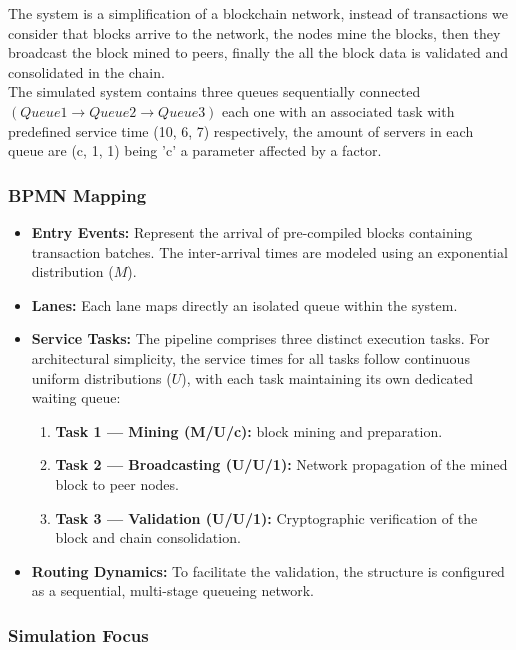 \documentclass[12pt,a4paper]{article}
\begin{document}
	The system is a simplification of a blockchain network, instead of transactions we consider that blocks arrive to the network, the nodes mine the blocks, then they broadcast the block mined to peers, finally the all the block data is validated and consolidated in the chain.\\
	
	\noindent The simulated system contains three queues sequentially connected $(Queue1 \to Queue2 \to Queue3)$ each one with an associated task with predefined service time (10, 6, 7) respectively, the amount of servers in each queue are (c, 1, 1) being 'c' a parameter affected by a factor.
	
	\subsubsection*{BPMN Mapping}
	
	\begin{itemize}
		\item \textbf{Entry Events:} Represent the arrival of pre-compiled blocks containing transaction batches. The inter-arrival times are modeled using an exponential distribution ($M$).
		\item \textbf{Lanes:} Each lane maps directly an isolated queue within the system.
		\item \textbf{Service Tasks:} The pipeline comprises three distinct execution tasks. For architectural simplicity, the service times for all tasks follow continuous uniform distributions ($U$), with each task maintaining its own dedicated waiting queue:
		\begin{enumerate}
			\item \textbf{Task 1 --- Mining (M/U/c):} block mining and preparation.
			\item \textbf{Task 2 --- Broadcasting (U/U/1):} Network propagation of the mined block to peer nodes.
			\item \textbf{Task 3 --- Validation (U/U/1):} Cryptographic verification of the block and chain consolidation.
		\end{enumerate}
		\item \textbf{Routing Dynamics:} To facilitate the validation, the structure is configured as a sequential, multi-stage queueing network. 
	\end{itemize}
	
	\subsubsection*{Simulation Focus}
	
\end{document}
